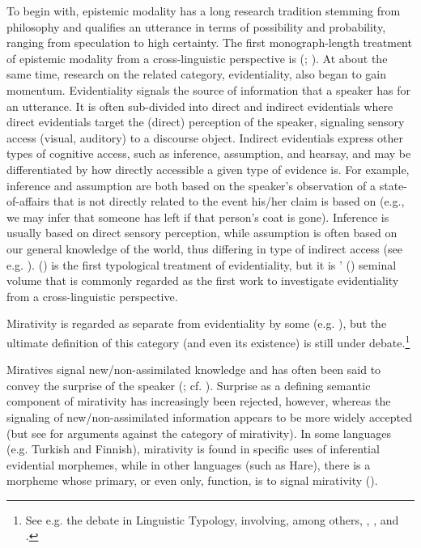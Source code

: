 \documentclass[output=paper]{langsci/langscibook}
\begin{document}
To begin with, epistemic modality has a long research tradition stemming from philosophy and qualifies an utterance in terms of possibility and probability, ranging from speculation to high certainty. The first monograph-length treatment of epistemic modality from a cross-linguistic perspective is \citeauthor{Palmer1986} (\citeyear{Palmer1986}; \citeyear{Palmer2001}). At about the same time, research on the related category, evidentiality, also began to gain momentum. Evidentiality signals the source of information that a speaker has for an utterance. It is often sub-divided into direct and indirect evidentials where direct evidentials target the (direct) perception of the speaker, signaling sensory access (visual, auditory) to a discourse object. Indirect evidentials express other types of cognitive access, such as inference, assumption, and hearsay, and may be differentiated by how directly accessible a given type of evidence is. For example, inference and assumption are both based on the speaker’s observation of a state-of-affairs that is not directly related to the event his/her claim is based on (e.g., we may infer that someone has left if that person’s coat is gone). Inference is usually based on direct sensory perception, while assumption is often based on our general knowledge of the world, thus differing in type of indirect access (see e.g. \citealt{Willett1988}). \citeauthor{Aikhenvald2004} (\citeyear{Aikhenvald2004}) is the first typological treatment of evidentiality, but it is \citeauthor{ChafeNichols1986}’ (\citeyear{ChafeNichols1986}) seminal volume that is commonly regarded as the first work to investigate evidentiality from a cross-linguistic perspective.

Mirativity is regarded as separate from evidentiality by some (e.g. \citealt{DeLancey1997}), but the ultimate definition of this category (and even its existence) is still under debate.\footnote{See e.g. the debate in Linguistic Typology, involving, among others, \cite{Hill2012}, \cite{DeLancey2012}, and \cite{HenegeveldOlbertz2012}.}

Miratives signal new/non-assimilated knowledge and has often been said to convey the surprise of the speaker (\citealt{DeLancey1997}; cf. \citealt{Aikhenvald2014}). Surprise as a defining semantic component of mirativity has increasingly been rejected, however, whereas the signaling of new/non-assimilated information appears to be more widely accepted (but see \citealt{Hill2012} for arguments against the category of mirativity). In some languages (e.g. Turkish and Finnish), mirativity is found in specific uses of inferential evidential morphemes, while in other languages (such as Hare), there is a morpheme whose primary, or even only, function, is to signal mirativity (\citealt{DeLancey1997}).
\end{document}
